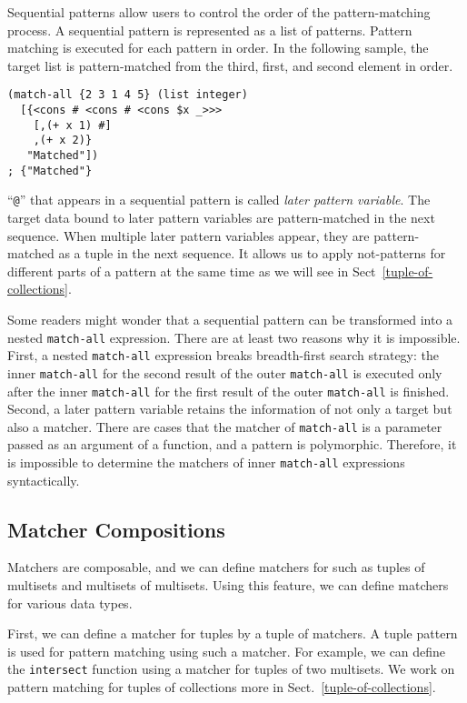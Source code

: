 \documentclass{article}
\begin{document}
Sequential patterns allow users to control the order of the pattern-matching process.
A sequential pattern is represented as a list of patterns.
Pattern matching is executed for each pattern in order.
In the following sample, the target list is pattern-matched from the third, first, and second element in order.

\begin{lstlisting}[language=egison]
(match-all {2 3 1 4 5} (list integer)
  [{<cons # <cons # <cons $x _>>>
    [,(+ x 1) #]
    ,(+ x 2)}
   "Matched"])
; {"Matched"}
\end{lstlisting}

\noindent ``\verb|@|'' that appears in a sequential pattern is called \emph{later pattern variable}.
The target data bound to later pattern variables are pattern-matched in the next sequence.
When multiple later pattern variables appear, they are pattern-matched as a tuple in the next sequence.
It allows us to apply not-patterns for different parts of a pattern at the same time as we will see in Sect~\ref{tuple-of-collections}.

Some readers might wonder that a sequential pattern can be transformed into a nested \texttt{match-all} expression.
There are at least two reasons why it is impossible.
First, a nested \texttt{match-all} expression breaks breadth-first search strategy: the inner \texttt{match-all} for the second result of the outer \texttt{match-all} is executed only after the inner \texttt{match-all} for the first result of the outer \texttt{match-all} is finished.
Second, a later pattern variable retains the information of not only a target but also a matcher.
There are cases that the matcher of \texttt{match-all} is a parameter passed as an argument of a function, and a pattern is polymorphic.
Therefore, it is impossible to determine the matchers of inner \texttt{match-all} expressions syntactically.

\subsection{Matcher Compositions}\label{matcher-compositions}

Matchers are composable, and we can define matchers for such as tuples of multisets and multisets of multisets.
Using this feature, we can define matchers for various data types.

First, we can define a matcher for tuples by a tuple of matchers.
A tuple pattern is used for pattern matching using such a matcher.
For example, we can define the \texttt{intersect} function using a matcher for tuples of two multisets.
We work on pattern matching for tuples of collections more in Sect.~\ref{tuple-of-collections}.
\end{document}
